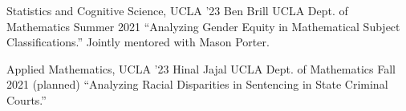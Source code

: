 
\begin{cventries}


  \cventry
    {Statistics and Cognitive Science, UCLA '23}
      {Ben Brill}
      {UCLA Dept. of Mathematics}
      {Summer 2021}
      {``Analyzing Gender Equity in Mathematical Subject Classifications.'' 
      Jointly mentored with Mason Porter.}

  \cventry
      {Applied Mathematics, UCLA '23}
      {Hinal Jajal}
      {UCLA Dept. of Mathematics}
      {Fall 2021 (planned)}
      {``Analyzing Racial Disparities in Sentencing in State Criminal Courts.''}
      
\end{cventries}

